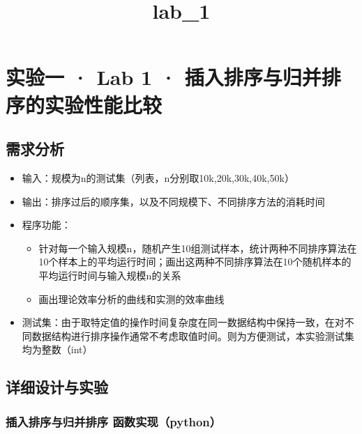 \documentclass[11pt]{article}
\title{lab\_1}
\providecommand{\tightlist}{%
      \setlength{\itemsep}{0pt}\setlength{\parskip}{0pt}}
\begin{document}
    
    \maketitle
    
    

    
    \hypertarget{ux5b9eux9a8cux4e00-lab-1-ux63d2ux5165ux6392ux5e8fux4e0eux5f52ux5e76ux6392ux5e8fux7684ux5b9eux9a8cux6027ux80fdux6bd4ux8f83}{%
\section{实验一 · Lab 1 ·
插入排序与归并排序的实验性能比较}\label{ux5b9eux9a8cux4e00-lab-1-ux63d2ux5165ux6392ux5e8fux4e0eux5f52ux5e76ux6392ux5e8fux7684ux5b9eux9a8cux6027ux80fdux6bd4ux8f83}}

\hypertarget{ux9700ux6c42ux5206ux6790}{%
\subsection{需求分析}\label{ux9700ux6c42ux5206ux6790}}

\begin{itemize}
\tightlist
\item
  输入：规模为n的测试集（列表，n分别取10k,20k,30k,40k,50k）
\item
  输出：排序过后的顺序集，以及不同规模下、不同排序方法的消耗时间
\item
  程序功能：

  \begin{itemize}
  \tightlist
  \item
    针对每一个输入规模n，随机产生10组测试样本，统计两种不同排序算法在10个样本上的平均运行时间；画出这两种不同排序算法在10个随机样本的平均运行时间与输入规模n的关系
  \item
    画出理论效率分析的曲线和实测的效率曲线
  \end{itemize}
\item
  测试集：由于取特定值的操作时间复杂度在同一数据结构中保持一致，在对不同数据结构进行排序操作通常不考虑取值时间。则为方便测试，本实验测试集均为整数（int）
\end{itemize}

\hypertarget{ux8be6ux7ec6ux8bbeux8ba1ux4e0eux5b9eux9a8c}{%
\subsection{详细设计与实验}\label{ux8be6ux7ec6ux8bbeux8ba1ux4e0eux5b9eux9a8c}}

\hypertarget{ux63d2ux5165ux6392ux5e8fux4e0eux5f52ux5e76ux6392ux5e8f-ux51fdux6570ux5b9eux73b0python}{%
\subsubsection{插入排序与归并排序
函数实现（python）}\label{ux63d2ux5165ux6392ux5e8fux4e0eux5f52ux5e76ux6392ux5e8f-ux51fdux6570ux5b9eux73b0python}}
\end{document}
